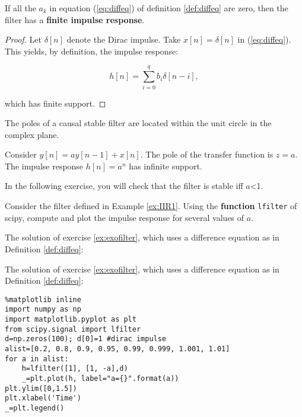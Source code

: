 \begin{property}
If all the \(a_k\) in equation
(\ref{eq:diffeq}) of definition \ref{def:diffeq} are zero, then the
filter has a \textbf{finite impulse response}.

\end{property}

\begin{proof}
Let \(\delta[n]\) denote the Dirac impulse.
Take \(x[n]=\delta[n]\) in (\ref{eq:diffeq}). This yields, by
definition, the impulse response:


\begin{equation}
\label{eq:fir}
h[n]= \sum_{i=0}^q b_i \delta[n-i],
\end{equation}


which has finite support. 
\end{proof}

\begin{theorem}
The poles of a causal stable filter are
located within the unit circle in the complex
plane.
\end{theorem}

\begin{example} \label{ex:IIR1}
Consider
\(y[n]= a y[n-1] + x[n]\). The pole of the transfer function is \(z=a\).
The impulse response \(h[n]=a^n\) has infinite
support.
\end{example}

In the following exercise, you will check that the filter is stable iff
\(a\)\textless{}1.

\begin{exercise}\label{ex:exofilter}
Consider the filter
defined in Example \ref{ex:IIR1}. Using the \textbf{function}
\texttt{lfilter} of scipy, compute and plot the impulse response for
several values of \(a\).
\end{exercise}

    \begin{listing}
The solution of exercise \ref{ex:exofilter}, which uses a difference equation as in Definition \ref{def:diffeq}:
\end{listing}

The solution of exercise \ref{ex:exofilter}, which uses a difference
equation as in Definition \ref{def:diffeq}:
\begin{lstlisting}
%matplotlib inline
import numpy as np
import matplotlib.pyplot as plt 
from scipy.signal import lfilter
d=np.zeros(100); d[0]=1 #dirac impulse
alist=[0.2, 0.8, 0.9, 0.95, 0.99, 0.999, 1.001, 1.01]
for a in alist:
    h=lfilter([1], [1, -a],d)
    _=plt.plot(h, label="a={}".format(a))
plt.ylim([0,1.5])
plt.xlabel('Time')
_=plt.legend()
\end{lstlisting}%
%
    \begin{center}
    \end{center}
    
